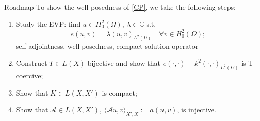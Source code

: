 \documentclass[11pt,aspectratio=169,xcolor=dvipsnames]{beamer}
\newcommand{\spl}{\langle}
\newcommand{\spr}{\rangle}
\newcommand{\nicearrow}[2]{\raisebox{#2}{\resizebox{0.45cm}{!}{\color{#1}{\MVRightArrow}\color{black}}}}
\begin{document}
\begin{frame}{Roadmap}
  To show the well-posedness of \eqref{CP}, we take the following steps: 
  \begin{enumerate}
    \item<1-> Study the EVP: find $u \in H^2_0(\Omega)$, $\lambda \in \mathbb{C}$ s.t. 
    \begin{equation*}
      e(u,v) = \lambda (u,v)_{L^2(\Omega)} \quad \forall v \in H^2_0(\Omega);
    \end{equation*}
    \nicearrow{GOE}{-0.07cm} self-adjointness, well-posedness, compact solution operator
    \item<2-> Construct $T \in L(X)$ bijective and show that $e(\cdot,\cdot) - k^2(\cdot,\cdot)_{L^2(\Omega)}$ is T-coercive;
    \item<3-> Show that $K \in L(X,X')$ is compact;
    \item<4-> Show that $\mathcal{A} \in L(X,X')$, $\spl \mathcal{A}u,v \spr_{X',X} := a(u,v)$, is injective.
  \end{enumerate}
  \begin{center}
  \end{center}
  \vspace*{-0.25cm}
\end{frame}
\end{document}
